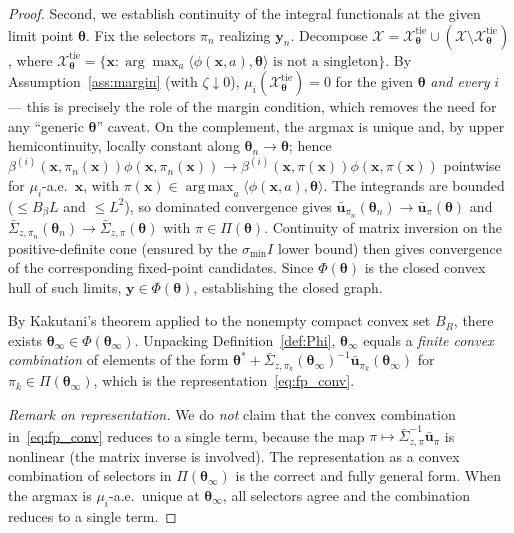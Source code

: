\documentclass[11pt]{article}
\DeclareMathOperator*{\argmax}{arg\,max}
\begin{document}
\begin{proof}
Second, we establish continuity of the integral functionals at the
given limit point $\bm{\theta}$.  Fix the selectors $\pi_n$ realizing
$\bm{y}_n$.  Decompose
$\mathcal{X}=\mathcal{X}^{\mathrm{tie}}_{\bm{\theta}}\cup
(\mathcal{X}\setminus\mathcal{X}^{\mathrm{tie}}_{\bm{\theta}})$, where
$\mathcal{X}^{\mathrm{tie}}_{\bm{\theta}}=\{\bm{x}:
\arg\max_a\langle\phi(\bm{x},a),\bm{\theta}\rangle
\text{ is not a singleton}\}$.
By Assumption~\ref{ass:margin} (with $\zeta\downarrow 0$),
$\mu_i(\mathcal{X}^{\mathrm{tie}}_{\bm{\theta}})=0$ for the given
$\bm{\theta}$ \emph{and every} $i$ --- this is precisely the role of
the margin condition, which removes the need for any ``generic
$\bm{\theta}$'' caveat.  On the complement, the argmax is unique and,
by upper hemicontinuity, locally constant along
$\bm{\theta}_n\to\bm{\theta}$; hence
$\beta^{(i)}(\bm{x},\pi_n(\bm{x}))\phi(\bm{x},\pi_n(\bm{x}))\to
\beta^{(i)}(\bm{x},\pi(\bm{x}))\phi(\bm{x},\pi(\bm{x}))$ pointwise for
$\mu_i$-a.e.\ $\bm{x}$, with $\pi(\bm{x})\in\argmax_a\langle\phi(\bm{x},a),
\bm{\theta}\rangle$.  The integrands are bounded ($\leq B_\beta L$ and
$\leq L^2$), so dominated convergence gives
$\bar{\bm{u}}_{\pi_n}(\bm{\theta}_n)\to\bar{\bm{u}}_\pi(\bm{\theta})$
and
$\bar{\Sigma}_{z,\pi_n}(\bm{\theta}_n)\to\bar{\Sigma}_{z,\pi}(\bm{\theta})$
with $\pi\in\Pi(\bm{\theta})$.
Continuity of matrix inversion on the positive-definite cone
(ensured by the $\sigma_{\min}I$ lower bound) then gives
convergence of the corresponding fixed-point candidates.
Since $\Phi(\bm{\theta})$ is the closed convex hull of such limits,
$\bm{y}\in\Phi(\bm{\theta})$, establishing the closed graph.

By Kakutani's theorem applied to the nonempty compact convex set $B_R$,
there exists $\bm{\theta}_\infty\in\Phi(\bm{\theta}_\infty)$.
Unpacking Definition~\ref{def:Phi}, $\bm{\theta}_\infty$ equals a
\emph{finite convex combination} of elements of the form
$\bm{\theta}^{\!*}+\bar{\Sigma}_{z,\pi_k}(\bm{\theta}_\infty)^{-1}
\bar{\bm{u}}_{\pi_k}(\bm{\theta}_\infty)$
for $\pi_k\in\Pi(\bm{\theta}_\infty)$,
which is the representation~\eqref{eq:fp_conv}.

\emph{Remark on representation.}
We do \emph{not} claim that the convex combination in~\eqref{eq:fp_conv}
reduces to a single term, because the map
$\pi\mapsto\bar{\Sigma}_{z,\pi}^{-1}\bar{\bm{u}}_\pi$ is nonlinear
(the matrix inverse is involved).  The representation as a convex
combination of selectors in $\Pi(\bm{\theta}_\infty)$ is the correct
and fully general form.  When the argmax is $\mu_i$-a.e.\ unique at
$\bm{\theta}_\infty$, all selectors agree and the combination reduces
to a single term.
\end{proof}
\end{document}

